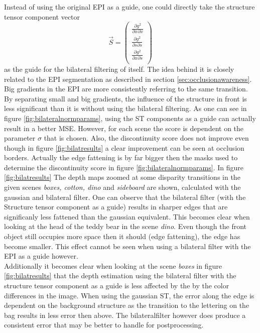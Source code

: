 \documentclass  [
  paper    = a4,
  BCOR     = 10mm,
  twoside,
  fontsize = 12pt,
  fleqn,
  toc      = bibnumbered,
  toc      = listofnumbered,
  numbers  = noendperiod,
  headings = normal,
  listof   = leveldown,
  version  = 3.03
]                                       {scrreprt}
\begin{document}
 Instead of using the original EPI as a guide, one could directly take the structure tensor component vector 
 \begin{equation}\label{key}
 \vec S = \left(\begin{matrix}
 \frac{\partial g^2}{\partial x \partial x} \\
 \frac{\partial g^2}{\partial s \partial s} \\
 \frac{\partial g^2}{\partial x \partial s} \\
 \end{matrix}\right)
 \end{equation}
 as the guide for the bilateral filtering of itself. The idea behind it is closely related to the EPI segmentation as described in section \ref{sec:occlusionawareness}. Big gradients in the EPI are more consistently referring to the same transition. By separating small and big gradients, the influence of the structure in front is less significant than it is without using the bilateral filtering. As one can see in figure \ref{fig:bilateralnormparams}, using the ST components as a guide can actually result in a better MSE. However, for each scene the score is dependent on the parameter $\sigma$ that is chosen. Also, the discontinuity score does not improve even though in figure \ref{fig:bilatresults} a clear improvement can be seen at occlusion borders. Actually the edge fattening is by far bigger then the masks used to determine the discontinuity score in figure \ref{fig:bilateralnormparams}. In figure \ref{fig:bilatresults} The depth maps zoomed at some disparity transitions in the given scenes \textit{boxes, cotton, dino} and \textit{sideboard} are shown, calculated with the gaussian and bilateral filter. One can observe that the bilateral filter (with the Structure tensor component as a guide) results in sharper edges that are significanly less \glqq fattened \grqq than the gaussian equivalent. This becomes clear when looking at the head of the teddy bear in the scene \textit{dino}. Even though the front object still occupies more space then it should (edge fattening), the edge has become smaller. This effect cannot be seen when using a bilateral filter with the EPI as a guide however.\\
 Additionally it becomes clear when looking at the scene \textit{boxes} in figure \ref{fig:bilatresults} that the depth estimation using the bilateral filter with the structure tensor component as a guide is less affected by the by the color differences in the image. When using the gaussian ST, the error along the edge is dependent on the background structure as the transition to the lettering on the bag results in less error then above. The bilateralfilter however does produce a consistent error that may be better to handle for postprocessing.
\end{document}
